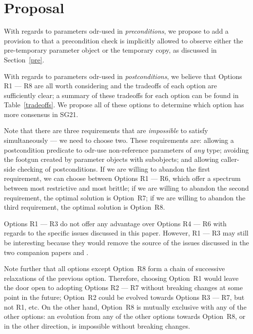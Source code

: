 \pagebreak

\section{Proposal}

With regards to parameters odr-used in \emph{preconditions}, we propose to add a provision to \cite{P2900R10} that a precondition check is implicitly allowed to observe either the pre-temporary parameter object or the temporary copy, as discussed in Section~\ref{pre}.

With regards to parameters odr-used in \emph{postconditions}, we believe that Options R1 --- R8 are all worth considering and the tradeoffs of each option are sufficiently clear; a summary of these tradeoffs for each option can be found in Table~\ref{tradeoffs}. We propose all of these options to determine which option has more consensus in SG21.

Note that there are three requirements that are \emph{impossible} to satisfy simultaneously --- we need to choose two. These requirements are: allowing a postcondition predicate to odr-use non-reference parameters of \emph{any} type; avoiding the footgun created by parameter objects with  subobjects; and allowing caller-side checking of postconditions. If we are willing to abandon the first requirement, we can choose between Options R1 --- R6, which offer a spectrum between most restrictive and most brittle; if we are willing to abandon the second requirement, the optimal solution is Option~R7; if we are willing to abandon the third requirement, the optimal solution is Option~R8.

Options R1 --- R3 do not offer any advantage over Options R4 --- R6 with regards to the specific issues discussed in this paper. However, R1 --- R3 may still be interesting because they would remove the source of the issues discussed in the two companion papers \cite{D3484R1} and \cite{D3489R0}. 

Note further that all options except Option~R8 form a chain of successive relaxations of the previous option. Therefore, choosing Option~R1 would leave the door open to adopting Options R2 --- R7 without breaking changes at some point in the future; Option~R2 could be evolved towards Options R3 --- R7, but not R1, etc. On the other hand, Option~R8 is mutually exclusive with any of the other options: an evolution from any of the other options towards Option~R8, or in the other direction, is impossible without breaking changes.


